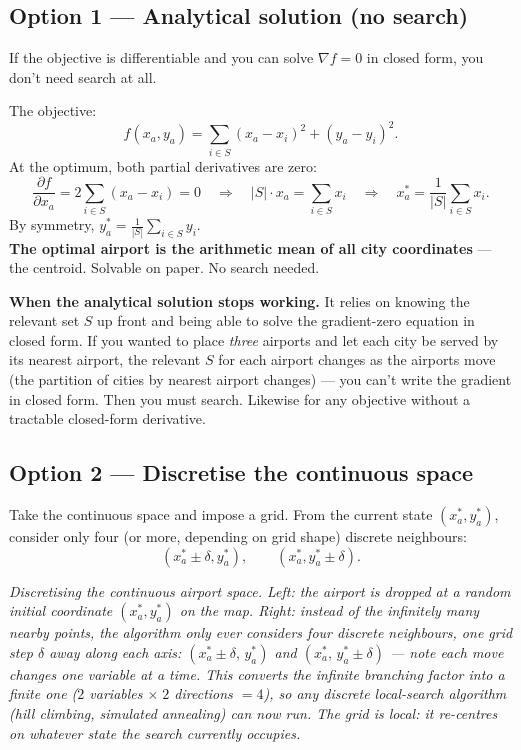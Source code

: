 \documentclass[11pt, a4paper]{article}
\begin{document}
\subsection{Option 1 — Analytical solution (no search)}

If the objective is differentiable and you can solve $\nabla f = 0$ in closed form, you don't need search at all.

\begin{exbox}
The objective:
\[
f(x_a, y_a) = \sum_{i \in S} (x_a - x_i)^2 + (y_a - y_i)^2.
\]
At the optimum, both partial derivatives are zero:
\[
\frac{\partial f}{\partial x_a} = 2 \sum_{i \in S} (x_a - x_i) = 0
\quad \Rightarrow \quad
|S| \cdot x_a = \sum_{i \in S} x_i
\quad \Rightarrow \quad
x_a^* = \frac{1}{|S|} \sum_{i \in S} x_i.
\]
By symmetry, $y_a^* = \frac{1}{|S|} \sum_{i \in S} y_i$.\\[0.3em]
\textbf{The optimal airport is the arithmetic mean of all city coordinates} — the centroid. Solvable on paper. No search needed.
\end{exbox}

\textbf{When the analytical solution stops working.} It relies on knowing the relevant set $S$ up front and being able to solve the gradient-zero equation in closed form. If you wanted to place \emph{three} airports and let each city be served by its nearest airport, the relevant $S$ for each airport changes as the airports move (the partition of cities by nearest airport changes) — you can't write the gradient in closed form. Then you must search. Likewise for any objective without a tractable closed-form derivative.

\subsection{Option 2 — Discretise the continuous space}

Take the continuous space and impose a grid. From the current state $(x_a^*, y_a^*)$, consider only four (or more, depending on grid shape) discrete neighbours:
\[
(x_a^* \pm \delta, y_a^*), \qquad (x_a^*, y_a^* \pm \delta).
\]

\begin{center}

\footnotesize\textit{Discretising the continuous airport space. \emph{Left:} the airport is dropped at a random initial coordinate $(x_a^*,y_a^*)$ on the map. \emph{Right:} instead of the infinitely many nearby points, the algorithm only ever considers four discrete neighbours, one grid step $\delta$ away along each axis: $(x_a^*\pm\delta,\,y_a^*)$ and $(x_a^*,\,y_a^*\pm\delta)$ --- note each move changes \emph{one} variable at a time. This converts the \emph{infinite} branching factor into a finite one ($2$ variables $\times\;2$ directions $= 4$), so any discrete local-search algorithm (hill climbing, simulated annealing) can now run. The grid is \emph{local}: it re-centres on whatever state the search currently occupies.}
\end{center}
\end{document}
